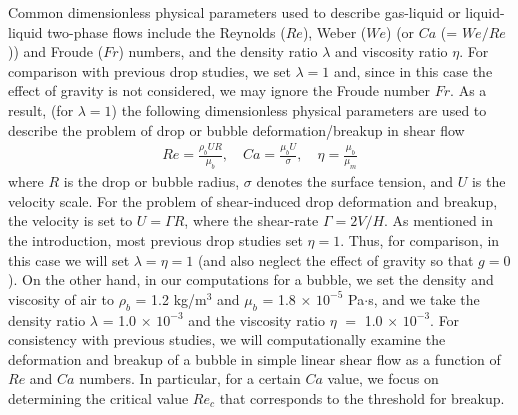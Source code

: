 \documentclass[%
 reprint,
 showkeys,
 amsmath,amssymb,
 aps,
 prfluids,
 onecolumn
]{revtex4-2}
\begin{document}
Common dimensionless physical parameters used to describe gas-liquid or
liquid-liquid two-phase flows include the Reynolds ($Re$), Weber ($We$) (or
$Ca$ (= $We/Re$)) and Froude ($Fr$) numbers, and the density ratio $\lambda$
and viscosity ratio $\eta$.  For comparison with previous drop studies, we set
$\lambda=1$ and, since in this case the effect of gravity is not considered, we
may ignore the Froude number $Fr$.  As a result, (for $\lambda=1$) the
following dimensionless physical parameters are used to describe the problem of
drop or bubble deformation/breakup in shear flow
%
\begin{eqnarray}\label{dimensonless}
  Re = \frac{\rho_{b}UR}{\mu_{b}}, \quad
  Ca = \frac{\mu_{b}U}{\sigma}, \quad
  \eta = \frac{\mu_{b}}{\mu_{m}}
\end{eqnarray} 
%
where $R$ is the drop or bubble radius, $\sigma$ denotes the surface tension,
and $U$ is the velocity scale. For the problem of shear-induced drop
deformation and breakup, the velocity is set to $U = \mathit{\Gamma} R$, where
the shear-rate $\mathit{\Gamma} = 2V/H$.  As mentioned in the introduction,
most previous drop studies set $\eta = 1$. Thus, for comparison, in this case
we will set $\lambda = \eta = 1$ (and also neglect the effect of gravity so
that $g=0$). On the other hand, in our computations for a bubble, we set the
density and viscosity of air to $\rho_{b}$ = 1.2 kg/m$^{3}$ and $\mu_{b}$ = 1.8
$\times$ $10^{-5}$ Pa$\cdot$s, and we take the 
density ratio 
$\lambda$ = 1.0 $\times$ $10^{-3}$ 
and the 
viscosity ratio 
$\eta$ $=$ 1.0 $\times$ $10^{-3}$.
For consistency with previous studies, we will computationally examine the
deformation and breakup of a bubble in simple linear shear flow as a
function of $Re$ and $Ca$ numbers.  In particular, 
for a certain $Ca$ value, we
focus on determining the critical value 
$Re_{c}$ that corresponds to the threshold
for breakup.

\end{document}
